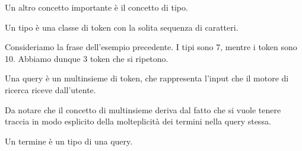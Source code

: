 Un altro concetto importante è il concetto di tipo.
\begin{definizione}[tipo]\label{def:tipo}
	Un tipo è una classe di token con la solita sequenza di caratteri.
\end{definizione}
\begin{esempio}
	Consideriamo la frase dell'esempio precedente. I tipi sono 7, mentre i token sono 10. Abbiamo dunque
	3 token che si ripetono.
\end{esempio}
\begin{definizione}[query]\label{def:query}
	Una query è un multinsieme di token, che rappresenta l'input che il motore di ricerca
	riceve dall'utente. 
\end{definizione}
Da notare che il concetto di multinsieme deriva dal fatto che si vuole tenere traccia in modo esplicito 
della molteplicità
dei termini nella query stessa.

\begin{definizione}[termine]\label{def:temine}
	Un termine è un tipo di una query.
\end{definizione}

